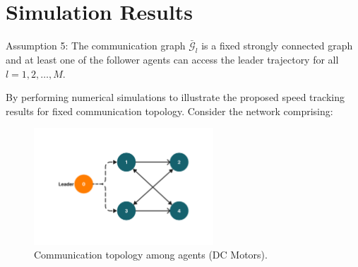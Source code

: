 \documentclass[journal,onecolumn]{IEEEtran}
\begin{document}

\section{Simulation Results}



Assumption 5: The communication graph \(\bar{\mathcal{G}}_l\) is a fixed strongly connected graph and at least one of the follower agents can access the leader trajectory for all \(l = 1,2,\dots,M\).

By performing numerical simulations to illustrate the proposed speed tracking results for fixed communication topology. Consider the network comprising:

\begin{figure}[H]
    \centering
    \includegraphics[width=0.6\textwidth]{communication.png}
    \caption{Communication topology among agents (DC Motors).}
    \label{fig:communication1} %
\end{figure}
\end{document}
